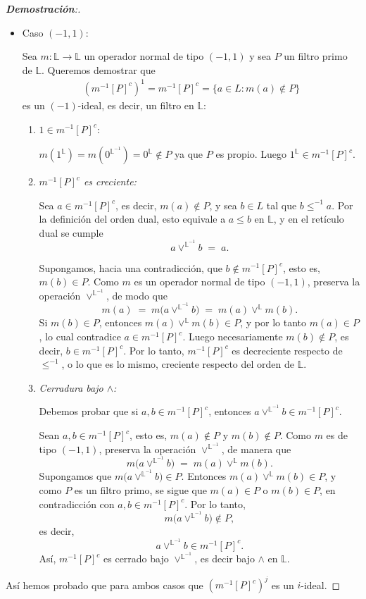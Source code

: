 \documentclass[12pt]{book}
\begin{document}
\begin{proof}[\textbf{Demostración}:]
\begin{itemize}
\medskip

\item Caso $(-1, 1)$:

Sea $m : \mathbb{L} \to \mathbb{L}$ un operador normal de tipo $(-1,1)$ y sea $P$ un filtro primo de $\mathbb{L}$. Queremos demostrar que 
\begin{align*}
\left(m^{-1}[P]^c\right)^1 = m^{-1}[P]^c = \{ a \in L : m(a) \notin P \}
\end{align*}
es un $(-1)$-ideal, es decir, un filtro en $\mathbb{L}$:

\begin{enumerate}
  \item \textit{$1\in m^{-1}[P]^c$}:
  
$m(1^{\mathbb{L}})=m(0^{\mathbb{L}^{-1}})=0^{\mathbb{L}}\notin P$ ya que $P$ es propio. Luego $1^{\mathbb{L}}\in m^{-1}[P]^c$.



  \item \emph{$m^{-1}[P]^c$ es creciente:} 
  

  Sea $a\in m^{-1}[P]^c$, es decir, $m(a)\notin P$, y sea $b\in L$ tal que
$b\leq^{-1} a$. Por la definición del orden dual, esto equivale a $a\leq b$ en
$\mathbb{L}$, y en el retículo dual se cumple
\[
a\vee^{\mathbb{L}^{-1}} b \;=\; a.
\]

Supongamos, hacia una contradicción, que $b\notin m^{-1}[P]^c$, esto es,
$m(b)\in P$. Como $m$ es un operador normal de tipo $(-1,1)$, preserva la
operación $\vee^{\mathbb{L}^{-1}}$, de modo que
\[
m(a)
\;=\;
m\bigl(a\vee^{\mathbb{L}^{-1}} b\bigr)
\;=\;
m(a)\vee^{\mathbb{L}} m(b).
\]
Si $m(b)\in P$, entonces $m(a)\vee^{\mathbb{L}} m(b)\in P$, y por lo tanto
$m(a)\in P$, lo cual contradice $a\in m^{-1}[P]^c$. Luego necesariamente
$m(b)\notin P$, es decir, $b\in m^{-1}[P]^c$. Por lo tanto, $m^{-1}[P]^c$ es
decreciente respecto de $\leq^{-1}$, o lo que es lo mismo, creciente respecto del orden de $\mathbb{L}$.

\item \emph{Cerradura bajo $\wedge$:}

Debemos probar que si $a,b\in m^{-1}[P]^c$, entonces
$a\vee^{\mathbb{L}^{-1}} b\in m^{-1}[P]^c$.

Sean $a,b\in m^{-1}[P]^c$, esto es, $m(a)\notin P$ y $m(b)\notin P$. Como $m$
es de tipo $(-1,1)$, preserva la operación $\vee^{\mathbb{L}^{-1}}$, de manera
que
\[
m\bigl(a\vee^{\mathbb{L}^{-1}} b\bigr)
\;=\;
m(a)\vee^{\mathbb{L}} m(b).
\]
Supongamos que $m\bigl(a\vee^{\mathbb{L}^{-1}} b\bigr)\in P$. Entonces
$m(a)\vee^{\mathbb{L}} m(b)\in P$, y como $P$ es un filtro primo, se sigue que
$m(a)\in P$ o $m(b)\in P$, en contradicción con $a,b\in m^{-1}[P]^c$. Por lo tanto,
\[
m\bigl(a\vee^{\mathbb{L}^{-1}} b\bigr)\notin P,
\]
es decir,
\[
a\vee^{\mathbb{L}^{-1}} b\in m^{-1}[P]^c.
\]
Así, $m^{-1}[P]^c$ es cerrado bajo $\vee^{\mathbb{L}^{-1}}$, es decir bajo $\wedge$ en $\mathbb{L}$.
\end{enumerate}
\end{itemize}
Así hemos probado que para ambos casos que $\left(m^{-1}[P]^c\right)^j$ es un $i$-ideal.
\end{proof}
\end{document}
